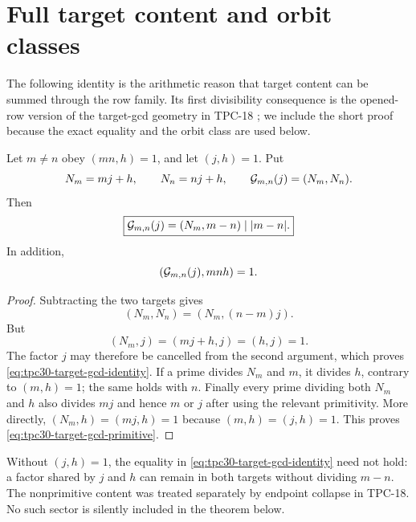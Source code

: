 \section{Full target content and orbit classes}
\label{sec:tpc30-target-geometry}

The following identity is the arithmetic reason that target content
can be summed through the row family.  Its first divisibility
consequence is the opened-row version of the target-gcd geometry in
TPC-18 \citep{WangTPC18}; we include the short proof because the exact
equality and the orbit class are used below.

\begin{lemma}
\label{lem:tpc30-target-gcd}
Let $m\ne n$ obey $(mn,h)=1$, and let $(j,h)=1$.  Put
\begin{equation}
 N_m=mj+h,
 \qquad
 N_n=nj+h,
 \qquad
 \mathcal G_{m,n}(j)=(N_m,N_n).
 \label{eq:tpc30-target-gcd-definition}
\end{equation}
Then
\begin{equation}
 \boxed{
 \mathcal G_{m,n}(j)
 =(N_m,m-n)\mid |m-n|.}
 \label{eq:tpc30-target-gcd-identity}
\end{equation}
In addition,
\begin{equation}
 (\mathcal G_{m,n}(j),mnh)=1.
 \label{eq:tpc30-target-gcd-primitive}
\end{equation}
\end{lemma}

\begin{proof}
Subtracting the two targets gives
\[
 (N_m,N_n)=(N_m,(n-m)j).
\]
But
\[
 (N_m,j)=(mj+h,j)=(h,j)=1.
\]
The factor $j$ may therefore be cancelled from the second argument,
which proves \eqref{eq:tpc30-target-gcd-identity}.  If a prime divides
$N_m$ and $m$, it divides $h$, contrary to $(m,h)=1$; the same holds
with $n$.  Finally every prime dividing both $N_m$ and $h$ also
divides $mj$ and hence $m$ or $j$ after using the relevant
primitivity.  More directly,
$(N_m,h)=(mj,h)=1$ because $(m,h)=(j,h)=1$.  This proves
\eqref{eq:tpc30-target-gcd-primitive}.
\end{proof}

\begin{remark}
\label{rem:tpc30-nonprimitive-gcd}
Without $(j,h)=1$, the equality in
\eqref{eq:tpc30-target-gcd-identity} need not hold: a factor shared by
$j$ and $h$ can remain in both targets without dividing $m-n$.  The
nonprimitive content was treated separately by endpoint collapse in
TPC-18.  No such sector is silently included in the theorem below.
\end{remark}

